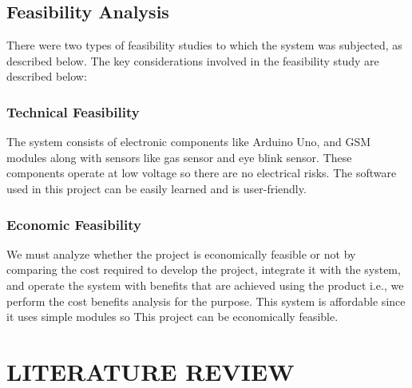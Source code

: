 \documentclass[12pt,a4paper]{report}
\begin{document}
	\section{Feasibility Analysis}
 There were two types of feasibility studies to which the system was subjected, as described below. The key considerations involved in the feasibility study are described below:
\vspace{0.75cm}
	\subsection{Technical Feasibility}
	
	\begin{justify}
The system consists of electronic components like Arduino Uno, and GSM modules along with sensors like gas sensor and eye blink sensor. These components operate at low voltage so there are no electrical risks. The software used in this project can be easily learned and is user-friendly.
	\end{justify}
	
	\subsection{Economic Feasibility}
	
	\begin{justify}
		We must analyze whether the project is economically feasible or not by comparing the cost required to develop the project, integrate it with the system, and operate the system with benefits that are achieved using the product i.e., we perform the cost benefits analysis for the purpose. This system is affordable since it uses simple modules so This project can be economically feasible.
	\end{justify}
	

	
	\chapter{LITERATURE REVIEW}
	
\end{document}
